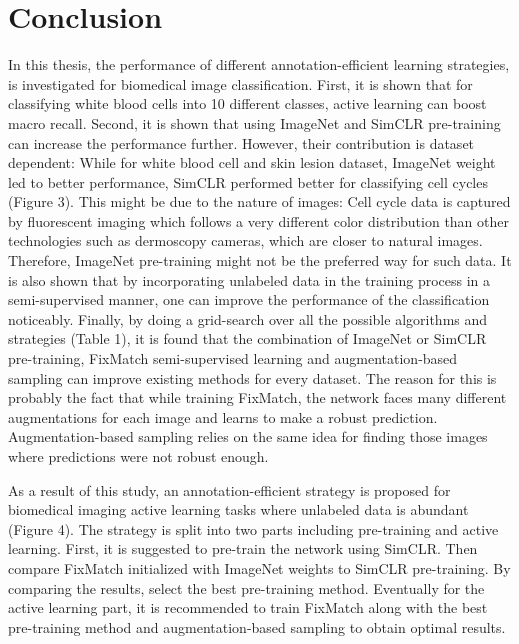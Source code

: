 
\chapter{Conclusion}\label{chapter:conclusion}

In this thesis, the performance of different annotation-efficient learning strategies, is investigated for biomedical image classification. First, it is shown that for classifying white blood cells into 10 different classes, active learning can boost macro recall. Second, it is shown that using ImageNet and SimCLR pre-training can increase the performance further. However, their contribution is dataset dependent: While for white blood cell and skin lesion dataset, ImageNet weight led to better performance, SimCLR performed better for classifying cell cycles (Figure 3). This might be due to the nature of images: Cell cycle data is captured by fluorescent imaging which follows a very different color distribution than other technologies such as dermoscopy cameras, which are closer to natural images. Therefore, ImageNet pre-training might not be the preferred way for such data.
It is also shown that by incorporating unlabeled data in the training process in a semi-supervised manner, one can improve the performance of the classification noticeably. Finally, by doing a grid-search over all the possible algorithms and strategies (Table 1), it is found that the combination of ImageNet or SimCLR pre-training, FixMatch semi-supervised learning and augmentation-based sampling can improve existing methods for every dataset. The reason for this is probably the fact that while training FixMatch, the network faces many different augmentations for each image and learns to make a robust prediction. Augmentation-based sampling relies on the same idea for finding those images where predictions were not robust enough. 

As a result of this study, an annotation-efficient strategy is proposed for biomedical imaging active learning tasks where unlabeled data is abundant (Figure 4). The strategy is split into two parts including pre-training and active learning. First, it is suggested to pre-train the network using SimCLR. Then compare FixMatch initialized with ImageNet weights to SimCLR pre-training. By comparing the results, select the best pre-training method. Eventually for the active learning part, it is recommended to train FixMatch along with the best pre-training method and augmentation-based sampling to obtain optimal results.

